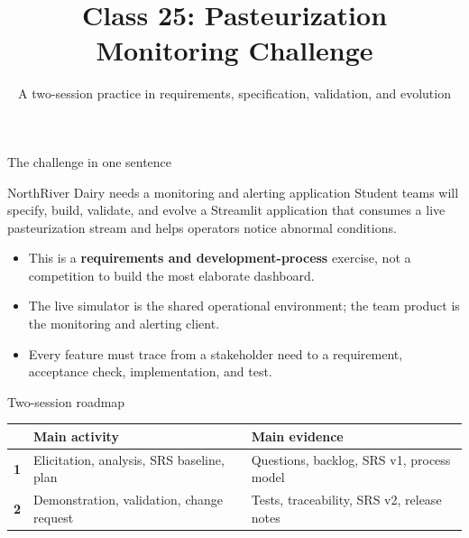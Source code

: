 

\title{Class 25: Pasteurization Monitoring Challenge}
\subtitle{A two-session practice in requirements, specification, validation, and evolution}
\author{\coursename}
\date{}


\frame{\titlepage \coursefooter}

\begin{frame}{The challenge in one sentence}
\begin{block}{NorthRiver Dairy needs a monitoring and alerting application}
Student teams will specify, build, validate, and evolve a Streamlit application that consumes a live pasteurization stream and helps operators notice abnormal conditions.
\end{block}
\begin{itemize}
\item This is a \textbf{requirements and development-process} exercise, not a competition to build the most elaborate dashboard.
\item The live simulator is the shared operational environment; the team product is the monitoring and alerting client.
\item Every feature must trace from a stakeholder need to a requirement, acceptance check, implementation, and test.
\end{itemize}
\coursefooter
\end{frame}

\begin{frame}{Two-session roadmap}
\centering
{}
\vspace{0.7em}
\begin{tabularx}{\textwidth}{>{\bfseries}l X X}
& Main activity & Main evidence \\
\toprule
1 & Elicitation, analysis, SRS baseline, plan & Questions, backlog, SRS v1, process model \\
2 & Demonstration, validation, change request & Tests, traceability, SRS v2, release notes \\
\bottomrule
\end{tabularx}
\coursefooter
\end{frame}

